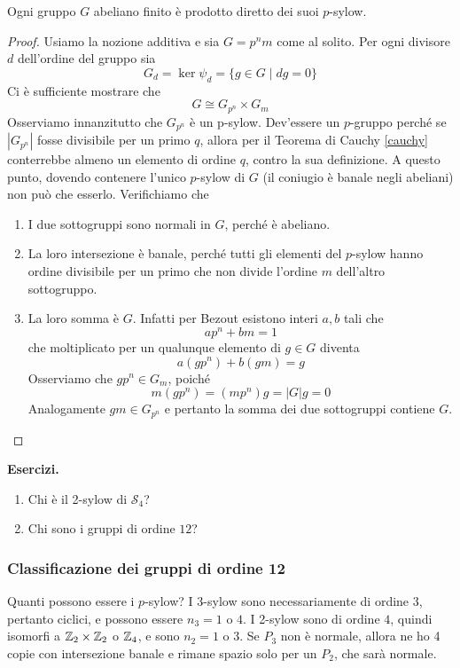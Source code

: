 \begin{multicols}{2}
\begin{theorem}
	Ogni gruppo $ G $ abeliano finito è prodotto diretto dei suoi $ p $-sylow.
\end{theorem}
\begin{proof}
	Usiamo la nozione additiva e sia $ G = p^nm $ come al solito. Per ogni divisore $ d$ dell'ordine del gruppo sia
	\[ G_d = \ker\psi_d = \{ g \in G \mid dg = 0 \} \]
	Ci è sufficiente mostrare che
	\[ G \cong G_{p^n} \times G_m \]
	Osserviamo innanzitutto che $ G_{p^n} $ è un p-sylow. Dev'essere un $ p $-gruppo perché se $ |G_{p^n}| $ fosse divisibile per un primo $ q $, allora per il Teorema di Cauchy \ref{cauchy} conterrebbe almeno un elemento di ordine $ q $, contro la sua definizione. A questo punto, dovendo contenere l'unico $ p $-sylow di $ G $  (il coniugio è banale negli abeliani) non può che esserlo.
	Verifichiamo che
	\begin{enumerate}
		\item I due sottogruppi sono normali in $ G $, perché è abeliano.
		\item La loro intersezione è banale, perché tutti gli elementi del $ p $-sylow hanno ordine divisibile per un primo che non divide l'ordine $ m $ dell'altro sottogruppo.
		\item La loro somma è $ G $. Infatti per Bezout esistono interi $ a, b $ tali che
		\[ ap^n + bm = 1 \]
		che moltiplicato per un qualunque elemento di $ g \in G $ diventa
		\[ a(gp^n) + b(gm) = g \]
		Osserviamo che $ gp^n \in G_{m} $, poiché $$  m (gp^n) = (mp^n) g = |G| g = 0  $$
		Analogamente $ gm \in G_{p^n} $ e pertanto la somma dei due sottogruppi contiene $ G $.
	\end{enumerate}
\end{proof}

\textbf{Esercizi.}
\begin{enumerate}
	\item Chi è il 2-sylow di $ \mathcal{S}_4 $?
	\item Chi sono i gruppi di ordine $ 12 $?
\end{enumerate}
\bigskip
\subsubsection{Classificazione dei gruppi di ordine 12}

Quanti possono essere i $ p $-sylow?
I 3-sylow sono necessariamente di ordine $ 3 $, pertanto ciclici, e possono essere $ n_3 = 1 $ o $ 4 $. I 2-sylow sono di ordine $ 4 $, quindi isomorfi a $ \mathbb{Z}_2 \times \mathbb{Z}_2 $ o $ \mathbb{Z}_4 $, e sono $ n_2 = 1 $ o $ 3 $. Se $ P_3 $ non è normale, allora ne ho 4 copie con intersezione banale e rimane spazio solo per un $ P_2 $, che sarà normale. \\


\end{multicols}
